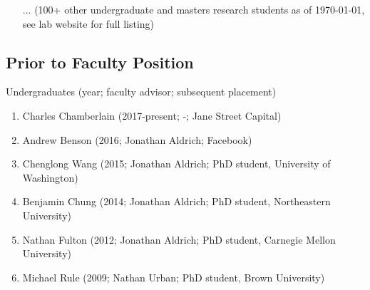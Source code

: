 \documentclass[10pt,letterpaper]{article}
\renewenvironment{itemize}{
  \begin{list}{}{
    \setlength{\leftmargin}{1.25em}
    \setlength{\itemsep}{0.25em}
    \setlength{\parskip}{0pt}
    \setlength{\parsep}{0.2em}
  }
}{
  \end{list}
}
\begin{document}
\begin{itemize}
\begin{enumerate}
          \item[...] (100+ other undergraduate and masters research students as of \today, see lab website for full listing)
        \end{enumerate}
\end{itemize}

\subsection*{Prior to Faculty Position}

\begin{itemize}
  \item Undergraduates (year; faculty advisor; subsequent placement)
        \begin{enumerate}
          \item Charles Chamberlain (2017-present; -; Jane Street Capital)
          \item Andrew Benson (2016; Jonathan Aldrich; Facebook)
          \item Chenglong Wang (2015; Jonathan Aldrich; PhD student, University of Washington)
          \item Benjamin Chung (2014; Jonathan Aldrich; PhD student, Northeastern University)
          \item Nathan Fulton (2012; Jonathan Aldrich; PhD student, Carnegie Mellon University)
          \item Michael Rule (2009; Nathan Urban; PhD student, Brown University)
        \end{enumerate}
\end{itemize}
\end{document}
